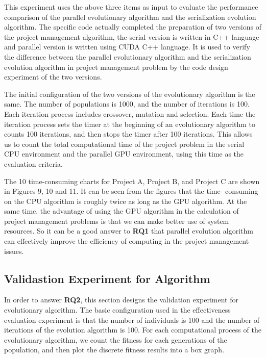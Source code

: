 
This experiment uses the above three items as input to evaluate the 
performance comparison of the parallel evolutionary algorithm and the 
serialization evolution algorithm. The specific code actually completed the 
preparation of two versions of the project management algorithm, the serial 
version is written in C++ language and parallel version is written using CUDA
C++ language. It is used to verify the difference between the parallel 
evolutionary algorithm and the serialization evolution algorithm in project 
management problem by the code design experiment of the two versions.


The initial configuration of the two versions of the evolutionary algorithm 
is the same. The number of populations is 1000, and the number of iterations 
is 100. Each iteration process includes crossover, mutation and selection. 
Each time the iteration process sets the timer at the beginning of an 
evolutionary algorithm to counts 100 iterations, and then stops the timer 
after 100 iterations. This allows us to count the total computational time of 
the project problem in the serial CPU environment and the parallel GPU 
environment, using this time as the evaluation criteria.


The 10 time-consuming charts for Project A, Project B, and Project C are 
shown in Figures 9, 10 and 11. It can be seen from the figures that the time-
consuming on the CPU algorithm is roughly twice as long as the GPU algorithm. 
At the same time, the advantage of using the GPU algorithm in the calculation 
of project management problems is that we can make better use of system 
resources. So it can be a good answer to \textbf{RQ1} that parallel evolution 
algorithm can effectively improve the efficiency of computing in the project 
management issues.


\subsection{Validastion Experiment for Algorithm}
%
In order to answer \textbf{RQ2}, this section designs the validation experiment for 
evolutionary algorithm. The basic configuration used in the effectiveness 
evaluation experiment is that the number of individuals is 100 and the number 
of iterations of the evolution algorithm is 100. For each computational 
process of the evolutionary algorithm, we count the fitness for each 
generations of the population, and then plot the discrete fitness results 
into a box graph.


